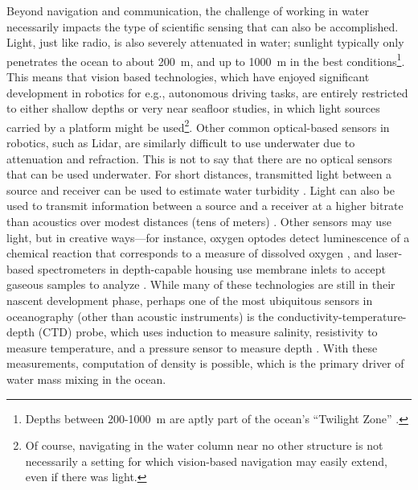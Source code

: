 Beyond navigation and communication, the challenge of working in water necessarily impacts the type of scientific sensing that can also be accomplished. Light, just like radio, is also severely attenuated in water; sunlight typically only penetrates the ocean to about \SI{200}{\meter}, and up to \SI{1000}{\meter} in the best conditions\footnote{Depths between 200-\SI{1000}{\meter} are aptly part of the ocean's ``Twilight Zone'' \autocite{martin2020oceans}.}. This means that vision based technologies, which have enjoyed significant development in robotics for e.g., autonomous driving tasks, are entirely restricted to either shallow depths or very near seafloor studies, in which light sources carried by a platform might be used\footnote{Of course, navigating in the water column near no other structure is not necessarily a setting for which vision-based navigation may easily extend, even if there was light.}. Other common optical-based sensors in robotics, such as Lidar, are similarly difficult to use underwater due to attenuation and refraction. This is not to say that there are no optical sensors that can be used underwater. For short distances, transmitted light between a source and receiver can be used to estimate water turbidity \autocite{bishop1999transmissometer}. Light can also be used to transmit information between a source and a receiver at a higher bitrate than acoustics over modest distances (tens of meters) \autocite{qureshi2016rf,farr2010integrated}. Other sensors may use light, but in creative ways---for instance, oxygen optodes detect luminescence of a chemical reaction that corresponds to a measure of dissolved oxygen \autocite{nicholson2017air}, and laser-based spectrometers in depth-capable housing use membrane inlets to accept gaseous samples to analyze \autocite{wankel2010new}. While many of these technologies are still in their nascent development phase, perhaps one of the most ubiquitous sensors in oceanography (other than acoustic instruments) is the conductivity-temperature-depth (CTD) probe, which uses induction to measure salinity, resistivity to measure temperature, and a pressure sensor to measure depth \autocite{rudnick2007underway}. With these measurements, computation of density is possible, which is the primary driver of water mass mixing in the ocean. 

